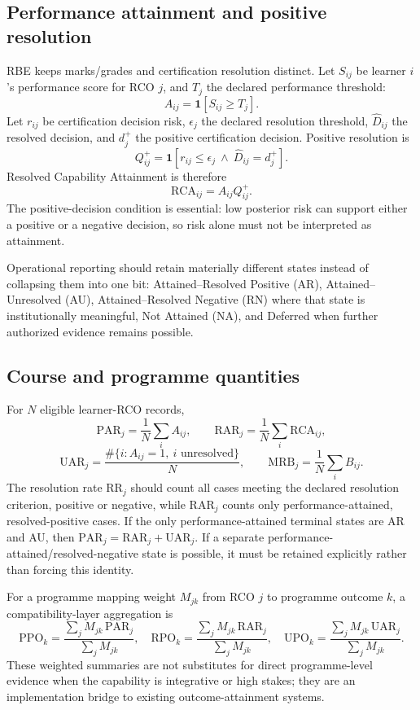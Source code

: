\subsection{Performance attainment and positive resolution}
RBE keeps marks/grades and certification resolution distinct. Let $S_{ij}$ be learner $i$'s performance score for RCO $j$, and $T_j$ the declared performance threshold:
\[
  A_{ij}=\mathbf{1}[S_{ij}\ge T_j].
\]
Let $r_{ij}$ be certification decision risk, $\epsilon_j$ the declared resolution threshold, $\widehat D_{ij}$ the resolved decision, and $d_j^+$ the positive certification decision. Positive resolution is
\[
  Q^+_{ij}=\mathbf{1}[r_{ij}\le\epsilon_j\ \land\ \widehat D_{ij}=d_j^+].
\]
Resolved Capability Attainment is therefore
\[
  \mathrm{RCA}_{ij}=A_{ij}Q^+_{ij}.
\]
The positive-decision condition is essential: low posterior risk can support either a positive or a negative decision, so risk alone must not be interpreted as attainment.

Operational reporting should retain materially different states instead of collapsing them into one bit: Attained--Resolved Positive (AR), Attained--Unresolved (AU), Attained--Resolved Negative (RN) where that state is institutionally meaningful, Not Attained (NA), and Deferred when further authorized evidence remains possible.

\subsection{Course and programme quantities}
For $N$ eligible learner-RCO records,
\[
  \mathrm{PAR}_j=\frac{1}{N}\sum_i A_{ij},\qquad
  \mathrm{RAR}_j=\frac{1}{N}\sum_i \mathrm{RCA}_{ij},
\]
\[
  \mathrm{UAR}_j=\frac{\#\{i:A_{ij}=1,\ i\text{ unresolved}\}}{N},\qquad
  \mathrm{MRB}_j=\frac{1}{N}\sum_i B_{ij}.
\]
The resolution rate $\mathrm{RR}_j$ should count all cases meeting the declared resolution criterion, positive or negative, while $\mathrm{RAR}_j$ counts only performance-attained, resolved-positive cases. If the only performance-attained terminal states are AR and AU, then $\mathrm{PAR}_j=\mathrm{RAR}_j+\mathrm{UAR}_j$. If a separate performance-attained/resolved-negative state is possible, it must be retained explicitly rather than forcing this identity.

For a programme mapping weight $M_{jk}$ from RCO $j$ to programme outcome $k$, a compatibility-layer aggregation is
\[
  \mathrm{PPO}_k=\frac{\sum_j M_{jk}\,\mathrm{PAR}_j}{\sum_j M_{jk}},\quad
  \mathrm{RPO}_k=\frac{\sum_j M_{jk}\,\mathrm{RAR}_j}{\sum_j M_{jk}},\quad
  \mathrm{UPO}_k=\frac{\sum_j M_{jk}\,\mathrm{UAR}_j}{\sum_j M_{jk}}.
\]
These weighted summaries are not substitutes for direct programme-level evidence when the capability is integrative or high stakes; they are an implementation bridge to existing outcome-attainment systems.

